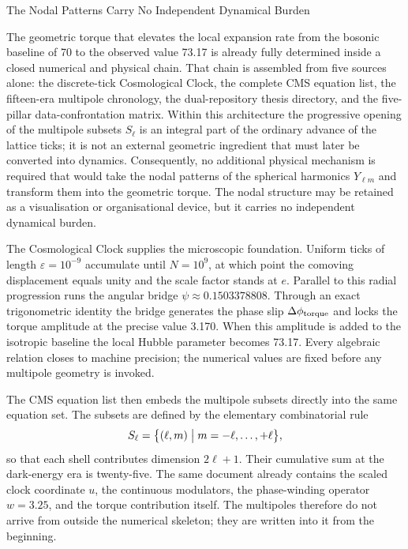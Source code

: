 The Nodal Patterns Carry No Independent Dynamical Burden

The geometric torque that elevates the local expansion rate from the bosonic baseline of 70 to the observed value 73.17 is already fully determined inside a closed numerical and physical chain. That chain is assembled from five sources alone: the discrete-tick Cosmological Clock, the complete CMS equation list, the fifteen-era multipole chronology, the dual-repository thesis directory, and the five-pillar data-confrontation matrix. Within this architecture the progressive opening of the multipole subsets \(S_\ell\) is an integral part of the ordinary advance of the lattice ticks; it is not an external geometric ingredient that must later be converted into dynamics. Consequently, no additional physical mechanism is required that would take the nodal patterns of the spherical harmonics \(Y_{\ell m}\) and transform them into the geometric torque. The nodal structure may be retained as a visualisation or organisational device, but it carries no independent dynamical burden.

The Cosmological Clock supplies the microscopic foundation. Uniform ticks of length \(\varepsilon=10^{-9}\) accumulate until \(N=10^9\), at which point the comoving displacement equals unity and the scale factor stands at \(e\). Parallel to this radial progression runs the angular bridge \(\psi\approx0.1503378808\). Through an exact trigonometric identity the bridge generates the phase slip \(\Delta\phi_{\rm torque}\) and locks the torque amplitude at the precise value 3.170. When this amplitude is added to the isotropic baseline the local Hubble parameter becomes 73.17. Every algebraic relation closes to machine precision; the numerical values are fixed before any multipole geometry is invoked.

The CMS equation list then embeds the multipole subsets directly into the same equation set. The subsets are defined by the elementary combinatorial rule
\[
S_\ell=\bigl\{(\ell,m)\bigm|m=-\ell,\dots,+\ell\bigr\},
\]
so that each shell contributes dimension \(2\ell+1\). Their cumulative sum at the dark-energy era is twenty-five. The same document already contains the scaled clock coordinate \(u\), the continuous modulators, the phase-winding operator \(w=3.25\), and the torque contribution itself. The multipoles therefore do not arrive from outside the numerical skeleton; they are written into it from the beginning.

